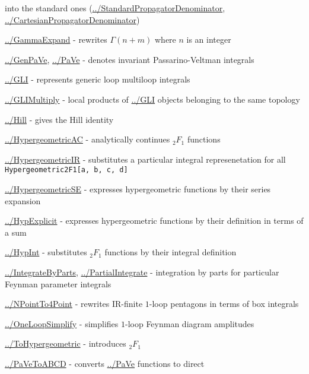 \documentclass[../FeynCalcManual.tex]{subfiles}
\begin{document}
\begin{itemize}
{  into the standard ones
  (\hyperlink{../standardpropagatordenominator}{../StandardPropagatorDenominator},
  \hyperlink{../cartesianpropagatordenominator}{../CartesianPropagatorDenominator})
\item
  \hyperlink{../gammaexpand}{../GammaExpand} - rewrites \(\Gamma(n+m)\)
  where \(n\) is an integer
\item
  \hyperlink{../genpave}{../GenPaVe}, \hyperlink{../pave}{../PaVe} -
  denotes invariant Passarino-Veltman integrals
\item
  \hyperlink{../gli}{../GLI} - represents generic loop multiloop
  integrals
\item
  \hyperlink{../glimultiply}{../GLIMultiply} - local products of
  \hyperlink{../gli}{../GLI} objects belonging to the same topology
\item
  \hyperlink{../hill}{../Hill} - gives the Hill identity
\item
  \hyperlink{../hypergeometricac}{../HypergeometricAC} - analytically
  continues \({}_2 F_1\) functions
\item
  \hyperlink{../hypergeometricir}{../HypergeometricIR} - substitutes a
  particular integral represenetation for all
  \texttt{Hypergeometric2F1[\allowbreak{}a,\ \allowbreak{}b,\ \allowbreak{}c,\ \allowbreak{}d]}
\item
  \hyperlink{../hypergeometricse}{../HypergeometricSE} - expresses
  hypergeometric functions by their series expansion
\item
  \hyperlink{../hypexplicit}{../HypExplicit} - expresses hypergeometric
  functions by their definition in terms of a sum
\item
  \hyperlink{../hypint}{../HypInt} - substitutes \({}_2 F_1\) functions
  by their integral definition
\item
  \hyperlink{../integratebyparts}{../IntegrateByParts},
  \hyperlink{../partialintegrate}{../PartialIntegrate} - integration by
  parts for particular Feynman parameter integrals
\item
  \hyperlink{../npointto4point}{../NPointTo4Point} - rewrites IR-finite
  \(1\)-loop pentagons in terms of box integrals
\item
  \hyperlink{../oneloopsimplify}{../OneLoopSimplify} - simplifies
  \(1\)-loop Feynman diagram amplitudes
\item
  \hyperlink{../tohypergeometric}{../ToHypergeometric} - introduces
  \({}_2 F_1\)
\item
  \hyperlink{../pavetoabcd}{../PaVeToABCD} - converts
  \hyperlink{../pave}{../PaVe} functions to direct
}
\end{itemize}
\end{document}
